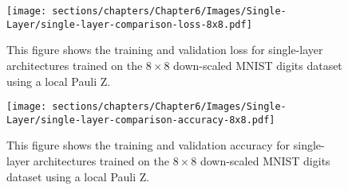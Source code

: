\begin{figure}[h]
    \centering
    \texttt{[image: sections/chapters/Chapter6/Images/Single-Layer/single-layer-comparison-loss-8x8.pdf]}
    \caption{This figure shows the training and validation loss for single-layer architectures
    trained on the $8\times8$ down-scaled MNIST digits dataset using a local Pauli Z.}
    \label{fig:Single-loss}
\end{figure}

\begin{figure}[h]
    \centering
    \texttt{[image: sections/chapters/Chapter6/Images/Single-Layer/single-layer-comparison-accuracy-8x8.pdf]}
    \caption{This figure shows the training and validation accuracy for single-layer architectures
    trained on the $8\times8$ down-scaled MNIST digits dataset using a local Pauli Z.}
    \label{fig:Single-accuracy}
\end{figure}


